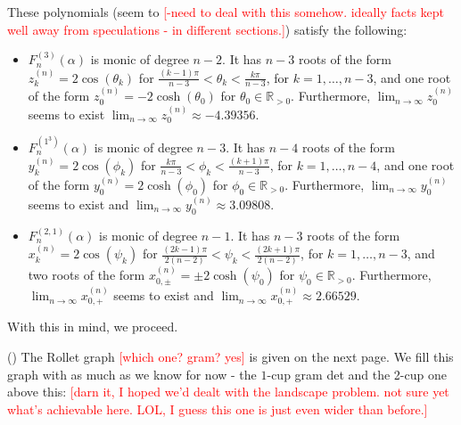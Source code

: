 \documentclass{article}
\newcommand{\ppm}[1]{\textcolor{red}{#1}}
\theoremstyle{definition}
\newcommand{\mdef}{\refstepcounter{theorem}       \medskip \noindent ({\bf \thetheorem}) }
\def\a{\alpha}
\def\R{\mathbb{R}}
\def\th{\theta}
\numberwithin{equation}{subsection}
\begin{document}
{These polynomials (seem to  \ppm{[-need to deal with this somehow. ideally facts kept well away from speculations - in different sections.]}) satisfy the following:
\begin{itemize}
    \item $F^{(3)}_{n}(\a)$ is monic of degree $n-2$. It has $n-3$ roots of the form $z_k^{(n)}=2\cos (\th_k)$ for $\frac{(k-1)\pi }{n-3}<\th_k<\frac{k\pi }{n-3}$, for $k=1,\dots, n-3$, and one root of the form $z_0^{(n)}=-2 \cosh(\th_0)$ for $\th_0\in \R_{>0}$. Furthermore, $\lim_{n\to \infty} z_0^{(n)}$ seems to exist
    $\lim_{n\to \infty} z_0^{(n)}\approx -4.39356$.
    \item $F^{(1^3)}_{n}(\a)$ is monic of degree $n-3$. It has $n-4$ roots of the form $y_k^{(n)}=2\cos (\phi_k)$ for $\frac{k\pi }{n-3}<\phi_k<\frac{(k+1)\pi }{n-3}$, for $k=1,\dots, n-4$, and one root of the form $y_0^{(n)}=2 \cosh(\phi_0)$ for $\phi_0\in \R_{>0}$. Furthermore, $\lim_{n\to \infty} y_0^{(n)}$ seems to exist and $\lim_{n\to \infty} y_0^{(n)}\approx 3.09808$.
    \item $F^{(2,1)}_{n}(\a)$ is monic of degree $n-1$. It has $n-3$ roots of the form $x_k^{(n)}=2\cos (\psi_k)$ for $\frac{(2k-1)\pi }{2(n-2)}<\psi_k<\frac{(2k+1)\pi }{2(n-2)}$, for $k=1,\dots, n-3$, and two roots of the form $x_{0,\pm}^{(n)}=\pm 2 \cosh(\psi_0)$ for $\psi_0\in \R_{>0}$. Furthermore, $\lim_{n\to \infty} x_{0,+}^{(n)}$ seems to exist and $\lim_{n\to \infty} x_{0,+}^{(n)}\approx 2.66529$.
\end{itemize}
With this in mind, we proceed. 

\mdef 
The Rollet graph \ppm{[which one? gram? yes]} is given on the next page. 
We fill this graph with as much as we know for now - the $1$-cup gram det and the 2-cup one above this:
\ppm{[darn it, I hoped we'd dealt with the landscape problem. not sure yet what's achievable here. LOL, I guess this one is just even wider than before.]}}
\end{document}
